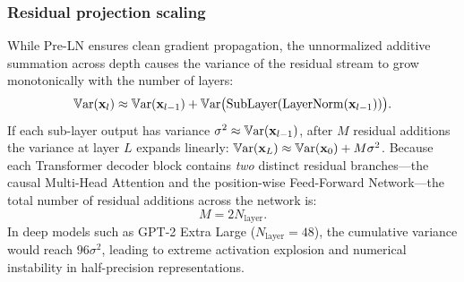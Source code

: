 \documentclass[../../main.tex]{subfiles}
\begin{document}
\subsubsection{Residual projection scaling}
While Pre-LN ensures clean gradient propagation, the unnormalized additive summation across depth causes the variance of the residual stream to grow monotonically with the number of layers:
\begin{equation}
\label{eq:variance_accumulation}
\operatorname{\mathbb{V}\mathrm{ar}}(\mathbf{x}_l) \approx \operatorname{\mathbb{V}\mathrm{ar}}(\mathbf{x}_{l-1}) + \operatorname{\mathbb{V}\mathrm{ar}}\bigl(\text{SubLayer}(\operatorname{\mathrm{LayerNorm}}(\mathbf{x}_{l-1}))\bigr).
\end{equation}
If each sub-layer output has variance $\sigma^2 \approx \operatorname{\mathbb{V}\mathrm{ar}}(\mathbf{x}_{l-1})$, after $M$ residual additions the variance at layer $L$ expands linearly: $\operatorname{\mathbb{V}\mathrm{ar}}(\mathbf{x}_L) \approx \operatorname{\mathbb{V}\mathrm{ar}}(\mathbf{x}_0) + M \sigma^2$. Because each Transformer decoder block contains \emph{two} distinct residual branches---the causal Multi-Head Attention and the position-wise Feed-Forward Network---the total number of residual additions across the network is:
\begin{equation}
M = 2 N_{\text{layer}}.
\end{equation}
In deep models such as GPT-2 Extra Large ($N_{\text{layer}} = 48$), the cumulative variance would reach $96 \sigma^2$, leading to extreme activation explosion and numerical instability in half-precision representations.
\end{document}
